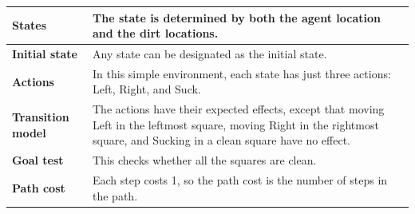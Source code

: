 \begin{customTableWrapper}{1.3}
\begin{longtable}{|p{3cm} p{10cm}|}
    \hline\endfirsthead
    \hline\endhead
    \hline\endfoot
    \hline\endlastfoot

    \textbf{States} & The state is determined by both the agent location and the dirt locations. \\ 
    \hline

    \textbf{Initial state} & Any state can be designated as the initial state.\\
    \hline

    \textbf{Actions} & In this simple environment, each state has just three actions: Left, Right, and Suck.\\
    \hline

    \textbf{Transition model} & The actions have their expected effects, except that moving Left in the leftmost square, moving Right in the rightmost square, and Sucking in a clean square have no effect. \\
    \hline

    \textbf{Goal test} & This checks whether all the squares are clean.\\
    \hline

    \textbf{Path cost} & Each step costs 1, so the path cost is the number of steps in the path.\\
    \hline
\end{longtable}
\end{customTableWrapper}

